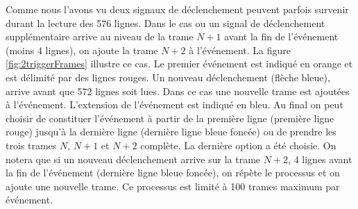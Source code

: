    \medskip
 
   Comme nous l'avons vu deux signaux de d\'eclenchement peuvent parfois survenir durant la lecture des 576 lignes. Dans le cas ou un signal de d\'eclenchement suppl\'ementaire arrive au niveau de la trame $N+1$ avant la fin de l'\'ev\'enement (moins 4 lignes), on ajoute la trame $N+2$ \`a l'\'ev\'enement. La figure \ref{fig:2triggerFrames} illustre ce cas. Le premier \'ev\'enement est indiqu\'e en orange et est d\'elimit\'e par des lignes rouges. Un nouveau d\'eclenchement (fl\`eche bleue), arrive avant que 572 lignes soit lues. Dans ce cas une nouvelle trame est ajout\'ees \`a l'\'ev\'enement. L'extension de l'\'ev\'enement est indiqu\'e en bleu. Au final on peut choisir de constituer l'\'ev\'enement \`a partir de la premi\`ere ligne (premi\`ere ligne rouge) jusqu'\`a la derni\`ere ligne (derni\`ere ligne bleue fonc\'ee) ou de prendre les trois trames $N$, $N+1$ et $N+2$ compl\`ete. La derni\`ere option a \'et\'e choisie. On notera que si un nouveau d\'eclenchement arrive sur la trame $N+2$, 4 lignes avant la fin de l'\'ev\'enement (derni\`ere ligne bleue fonc\'ee), on r\'ep\`ete le processus et on ajoute une nouvelle trame. Ce processus est limit\'e \`a 100 trames maximum par \'ev\'enement.
 


